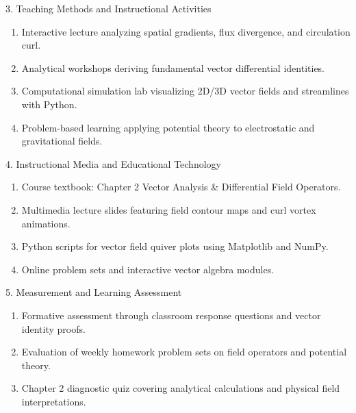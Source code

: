 \newpage

\begin{planbox}[colframe=rbruNavy!85!black, colbacktitle=rbruNavy!85!black]{3. Teaching Methods and Instructional Activities}
\begin{enumerate}[topsep=2pt, itemsep=1pt, partopsep=0pt, parsep=0pt, leftmargin=1.5em]
    \item Interactive lecture analyzing spatial gradients, flux divergence, and circulation curl.
    \item Analytical workshops deriving fundamental vector differential identities.
    \item Computational simulation lab visualizing 2D/3D vector fields and streamlines with Python.
    \item Problem-based learning applying potential theory to electrostatic and gravitational fields.
\end{enumerate}
\end{planbox}

\begin{planbox}[colframe=rbruGold!90!black, colbacktitle=rbruGold!90!black]{4. Instructional Media and Educational Technology}
\begin{enumerate}[topsep=2pt, itemsep=1pt, partopsep=0pt, parsep=0pt, leftmargin=1.5em]
    \item Course textbook: Chapter 2 Vector Analysis \& Differential Field Operators.
    \item Multimedia lecture slides featuring field contour maps and curl vortex animations.
    \item Python scripts for vector field quiver plots using Matplotlib and NumPy.
    \item Online problem sets and interactive vector algebra modules.
\end{enumerate}
\end{planbox}

\begin{planbox}[colframe=rbruSlate, colbacktitle=rbruSlate]{5. Measurement and Learning Assessment}
\begin{enumerate}[topsep=2pt, itemsep=1pt, partopsep=0pt, parsep=0pt, leftmargin=1.5em]
    \item Formative assessment through classroom response questions and vector identity proofs.
    \item Evaluation of weekly homework problem sets on field operators and potential theory.
    \item Chapter 2 diagnostic quiz covering analytical calculations and physical field interpretations.
\end{enumerate}
\end{planbox}
\clearpage

